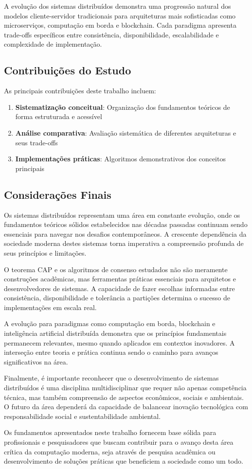 A evolução dos sistemas distribuídos demonstra uma progressão natural dos modelos cliente-servidor tradicionais para arquiteturas mais sofisticadas como microserviços, computação em borda e blockchain. Cada paradigma apresenta trade-offs específicos entre consistência, disponibilidade, escalabilidade e complexidade de implementação.

\subsection{Contribuições do Estudo}

As principais contribuições deste trabalho incluem:

\begin{enumerate}
    \item \textbf{Sistematização conceitual}: Organização dos fundamentos teóricos de forma estruturada e acessível
    \item \textbf{Análise comparativa}: Avaliação sistemática de diferentes arquiteturas e seus trade-offs
    \item \textbf{Implementações práticas}: Algoritmos demonstrativos dos conceitos principais
    
\end{enumerate}


\subsection{Considerações Finais}

Os sistemas distribuídos representam uma área em constante evolução, onde os fundamentos teóricos sólidos estabelecidos nas décadas passadas continuam sendo essenciais para navegar nos desafios contemporâneos. A crescente dependência da sociedade moderna destes sistemas torna imperativa a compreensão profunda de seus princípios e limitações.

O teorema CAP e os algoritmos de consenso estudados não são meramente construções acadêmicas, mas ferramentas práticas essenciais para arquitetos e desenvolvedores de sistemas. A capacidade de fazer escolhas informadas entre consistência, disponibilidade e tolerância a partições determina o sucesso de implementações em escala real.

A evolução para paradigmas como computação em borda, blockchain e inteligência artificial distribuída demonstra que os princípios fundamentais permanecem relevantes, mesmo quando aplicados em contextos inovadores. A interseção entre teoria e prática continua sendo o caminho para avanços significativos na área.

Finalmente, é importante reconhecer que o desenvolvimento de sistemas distribuídos é uma disciplina multidisciplinar que requer não apenas competência técnica, mas também compreensão de aspectos econômicos, sociais e ambientais. O futuro da área dependerá da capacidade de balancear inovação tecnológica com responsabilidade social e sustentabilidade ambiental.

Os fundamentos apresentados neste trabalho fornecem base sólida para profissionais e pesquisadores que buscam contribuir para o avanço desta área crítica da computação moderna, seja através de pesquisa acadêmica ou desenvolvimento de soluções práticas que beneficiem a sociedade como um todo.
